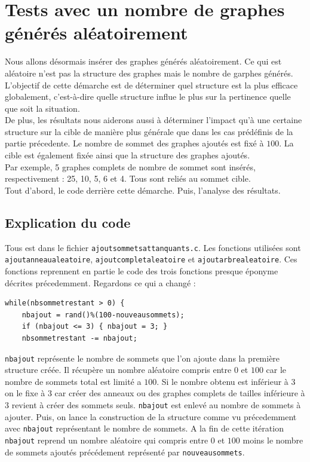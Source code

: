 \documentclass[a4paper,11pt]{article}
\begin{document}
\section{Tests avec un nombre de graphes générés aléatoirement}
	Nous allons désormais insérer des graphes générés aléatoirement. Ce qui est aléatoire n'est pas la structure des graphes mais le nombre de garphes générés.\\
	L'objectif de cette démarche est de déterminer quel structure est la plus efficace globalement, c'est-à-dire quelle structure influe le plus sur la pertinence quelle que soit la situation.\\
	De plus, les résultats nous aiderons aussi à déterminer l'impact qu'à une certaine structure sur la cible de manière plus générale que dans les cas prédéfinis de la partie précedente.
	Le nombre de sommet des graphes ajoutés est fixé à $100$.
	La cible est également fixée ainsi que la structure des graphes ajoutés.\\
	Par exemple, 5 graphes complets de nombre de sommet sont insérés, respectivement : 25, 10, 5, 6 et 4. Tous sont reliés au sommet cible.\\
	Tout d'abord, le code derrière cette démarche.
	Puis, l'analyse des résultats.

	\subsection{Explication du code}
		Tous est dans le fichier \texttt{ajoutsommetsattanquants.c}. Les fonctions utilisées sont \texttt{ajoutanneaualeatoire}, \texttt{ajoutcompletaleatoire}
		et \texttt{ajoutarbrealeatoire}. Ces fonctions reprennent en partie le code des trois fonctions presque éponyme décrites précedemment.
		Regardons ce qui a changé :
		\begin{lstlisting}
while(nbsommetrestant > 0) {
	nbajout = rand()%(100-nouveausommets);
	if (nbajout <= 3) { nbajout = 3; }
	nbsommetrestant -= nbajout;
		\end{lstlisting}
		\texttt{nbajout} représente le nombre de sommets que l'on ajoute dans la première structure créée. Il récupère un nombre aléatoire compris entre $0$ et $100$ car le nombre de sommets total est limité a $100$. Si le nombre obtenu est inférieur à $3$ on le fixe à $3$ car créer des anneaux ou des graphes complets de tailles inférieure à $3$ revient à créer des sommets seuls. \texttt{nbajout} est enlevé au nombre de sommets à ajouter. Puis, on lance la construction de la structure comme vu précedemment avec \texttt{nbajout} représentant le nombre de sommets. A la fin de cette itération \texttt{nbajout} reprend un nombre aléatoire qui compris entre $0$ et $100$ moins le nombre de sommets ajoutés précédement représenté par \texttt{nouveausommets}.
\end{document}
